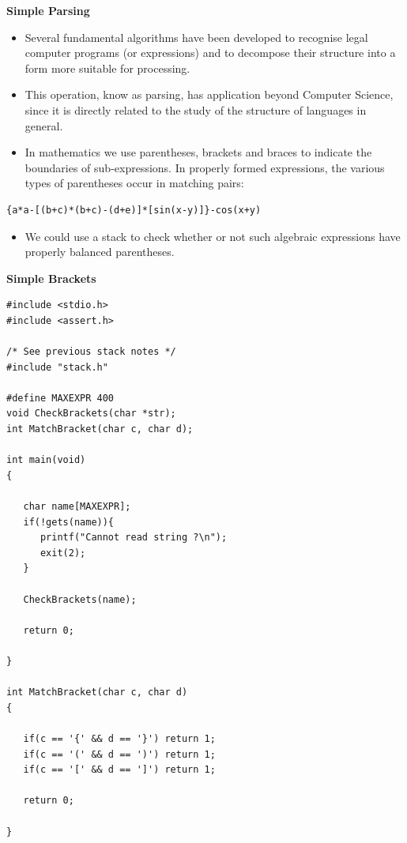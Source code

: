 \documentclass[a4,portraitt]{slides}
\begin{document}








\newpage
{\samepage
\begin{center}
{\Large{\bf Simple Parsing}}
\end{center}
\begin{itemize}
\item Several fundamental algorithms have been developed
to recognise legal computer programs (or expressions) and to
decompose their structure into a form more suitable for processing.
\item This operation, know as parsing, has application
beyond Computer Science, since it is directly related to the study of
the structure of languages in general.
\item In mathematics we use parentheses, brackets and
braces to indicate the boundaries of sub-expressions.
In properly formed expressions, the various types of parentheses occur in
matching pairs:
\end{itemize}
\begin{center}
{\small
\begin{verbatim}
{a*a-[(b+c)*(b+c)-(d+e)]*[sin(x-y)]}-cos(x+y)
\end{verbatim}
}
\end{center}
\begin{itemize}
\item We could use a stack to check whether or not such algebraic expressions
have properly balanced parentheses.
\end{itemize}
}

\newpage
{\samepage
\begin{center}
{\Large{\bf Simple Brackets}}
\end{center}
{\small
\begin{verbatim}
#include <stdio.h>
#include <assert.h>

/* See previous stack notes */
#include "stack.h"

#define MAXEXPR 400
void CheckBrackets(char *str);
int MatchBracket(char c, char d);

int main(void)
{

   char name[MAXEXPR];
   if(!gets(name)){
      printf("Cannot read string ?\n");
      exit(2);
   }

   CheckBrackets(name);

   return 0;

}

int MatchBracket(char c, char d)
{

   if(c == '{' && d == '}') return 1;
   if(c == '(' && d == ')') return 1;
   if(c == '[' && d == ']') return 1;

   return 0;

}
\end{verbatim}
}}
\end{document}
